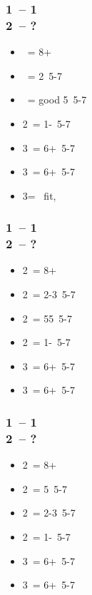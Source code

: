 \documentclass[12pt, a4paper]{report}
\begin{document}
{    \subsubsection*{1\hearts\ -- 1\spades\ \\ 2\clubs\ -- ?}
    \begin{itemize}
        \item \diams\ = 8+
        \item \hearts\ = 2\hearts\ 5-7
        \item \spades\ = good 5\spades\ 5-7
        \item 2\ntx\ = 1-\hearts\ 5-7
        \item 3\clubs\ = 6+\clubs\ 5-7
        \item 3\diams\ = 6+\diams\ 5-7
        \item 3\hearts = \hearts\ fit, \gf
    \end{itemize}

    \subsubsection*{1\hearts\ -- 1\ntx\ \\ 2\clubs\ -- ?}
    \begin{itemize}
        \item 2\diams\ = 8+
        \item 2\hearts\ = 2-3\hearts\ 5-7
        \item 2\spades\ = 55\minor\ 5-7
        \item 2\nt\ = 1-\hearts\ 5-7
        \item 3\clubs\ = 6+\clubs\ 5-7
        \item 3\diams\ = 6+\diams\ 5-7
    \end{itemize}

    \subsubsection*{1\spades\ -- 1\ntx\ \\ 2\clubs\ -- ?}
    \begin{itemize}
        \item 2\diams\ = 8+
        \item 2\hearts\ = 5\hearts\ 5-7
        \item 2\spades\ = 2-3\spades\ 5-7
        \item 2\ntx\ = 1-\spades\ 5-7
        \item 3\clubs\ = 6+\clubs\ 5-7
        \item 3\diams\ = 6+\diams\ 5-7
    \end{itemize}

}
\end{document}

